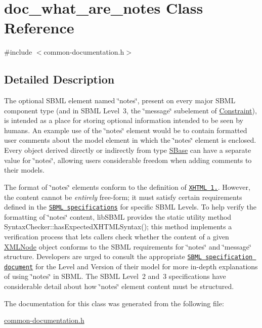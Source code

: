 \hypertarget{classdoc__what__are__notes}{}\section{doc\+\_\+what\+\_\+are\+\_\+notes Class Reference}
\label{classdoc__what__are__notes}


{\ttfamily \#include $<$common-\/documentation.\+h$>$}



\subsection{Detailed Description}
\begin{DoxyParagraph}{}
The optional S\+B\+ML element named \char`\"{}notes\char`\"{}, present on every major S\+B\+ML component type (and in S\+B\+ML Level~3, the \char`\"{}message\char`\"{} subelement of \hyperlink{class_constraint}{Constraint}), is intended as a place for storing optional information intended to be seen by humans. An example use of the \char`\"{}notes\char`\"{} element would be to contain formatted user comments about the model element in which the \char`\"{}notes\char`\"{} element is enclosed. Every object derived directly or indirectly from type \hyperlink{class_s_base}{S\+Base} can have a separate value for \char`\"{}notes\char`\"{}, allowing users considerable freedom when adding comments to their models.
\end{DoxyParagraph}
The format of \char`\"{}notes\char`\"{} elements conform to the definition of \href{http://www.w3.org/TR/xhtml1/}{\tt X\+H\+T\+ML~1.}. However, the content cannot be {\itshape entirely} free-\/form; it must satisfy certain requirements defined in the \href{http://sbml.org/Documents/Specifications}{\tt S\+B\+ML specifications} for specific S\+B\+ML Levels. To help verify the formatting of \char`\"{}notes\char`\"{} content, lib\+S\+B\+ML provides the static utility method Syntax\+Checker\+::has\+Expected\+X\+H\+T\+M\+L\+Syntax(); this method implements a verification process that lets callers check whether the content of a given \hyperlink{class_x_m_l_node}{X\+M\+L\+Node} object conforms to the S\+B\+ML requirements for \char`\"{}notes\char`\"{} and \char`\"{}message\char`\"{} structure. Developers are urged to consult the appropriate \href{http://sbml.org/Documents/Specifications}{\tt S\+B\+ML specification document} for the Level and Version of their model for more in-\/depth explanations of using \char`\"{}notes\char`\"{} in S\+B\+ML. The S\+B\+ML Level~2 and~3 specifications have considerable detail about how \char`\"{}notes\char`\"{} element content must be structured. 

The documentation for this class was generated from the following file\+:\begin{DoxyCompactItemize}
\item 
\hyperlink{common-documentation_8h}{common-\/documentation.\+h}\end{DoxyCompactItemize}

